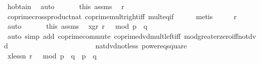 \begin{isabellebody}
\ h{\isacharunderscore}{\kern0pt}obtain\ \isamarkupfalse%
\ auto\isanewline
\ \ \isanewline
\ \ \isamarkupfalse%
\ this\ assms{\isacharparenleft}{\kern0pt}{}{\isacharcomma}{\kern0pt}{}{\isacharparenright}{\kern0pt}\ \isamarkupfalse%
\ {\isachardoublequoteopen}r\ {\isasymnoteq}\ {}{\isachardoublequoteclose}\ \isanewline
\ \ \ \ \isamarkupfalse%
\ coprime{\isacharunderscore}{\kern0pt}crossproduct{\isacharunderscore}{\kern0pt}nat\ coprime{\isacharunderscore}{\kern0pt}mult{\isacharunderscore}{\kern0pt}right{\isacharunderscore}{\kern0pt}iff\ mult{\isacharunderscore}{\kern0pt}eq{\isacharunderscore}{\kern0pt}if\isanewline
\ \ \ \ \isamarkupfalse%
\ {\isacharparenleft}{\kern0pt}metis{\isacharparenright}{\kern0pt}\isanewline
\ \ \isamarkupfalse%
\ \isamarkupfalse%
\ {\isachardoublequoteopen}r\ {\isachargreater}{\kern0pt}\ {}{\isachardoublequoteclose}\ \isamarkupfalse%
\ auto\isanewline
\ \ \isanewline
\ \ \isamarkupfalse%
\ this\ assms\ \isamarkupfalse%
\ x{\isacharunderscore}{\kern0pt}gr{\isacharunderscore}{\kern0pt}{}{\isacharcolon}{\kern0pt}\ {\isachardoublequoteopen}r\ {\isacharcircum}{\kern0pt}\ {}\ mod\ {\isacharparenleft}{\kern0pt}p\ {\isacharasterisk}{\kern0pt}\ q{\isacharparenright}{\kern0pt}\ {\isachargreater}{\kern0pt}\ {}{\isachardoublequoteclose}\ \isanewline
\ \ \ \ \isamarkupfalse%
\ {\isacharparenleft}{\kern0pt}auto\ simp\ add{\isacharcolon}{\kern0pt}\ coprime{\isacharunderscore}{\kern0pt}commute\ coprime{\isacharunderscore}{\kern0pt}dvd{\isacharunderscore}{\kern0pt}mult{\isacharunderscore}{\kern0pt}left{\isacharunderscore}{\kern0pt}iff\ mod{\isacharunderscore}{\kern0pt}greater{\isacharunderscore}{\kern0pt}zero{\isacharunderscore}{\kern0pt}iff{\isacharunderscore}{\kern0pt}not{\isacharunderscore}{\kern0pt}dvd\ \isanewline
\ \ \ \ \ \ \ \ \ \ \ \ \ \ \ \ \ \ \ \ \ \ \ nat{\isacharunderscore}{\kern0pt}dvd{\isacharunderscore}{\kern0pt}not{\isacharunderscore}{\kern0pt}less\ power{}{\isacharunderscore}{\kern0pt}eq{\isacharunderscore}{\kern0pt}square{\isacharparenright}{\kern0pt}\isanewline
\ \ \isanewline
\ \ \isamarkupfalse%
\ x{\isacharunderscore}{\kern0pt}less{\isacharunderscore}{\kern0pt}n{\isacharcolon}{\kern0pt}\ {\isachardoublequoteopen}r\ {\isacharcircum}{\kern0pt}\ {}\ mod\ {\isacharparenleft}{\kern0pt}p\ {\isacharasterisk}{\kern0pt}\ q{\isacharparenright}{\kern0pt}\ {\isacharless}{\kern0pt}\ p\ {\isacharasterisk}{\kern0pt}\ q{\isachardoublequoteclose}\ \isanewline

\end{isabellebody}
